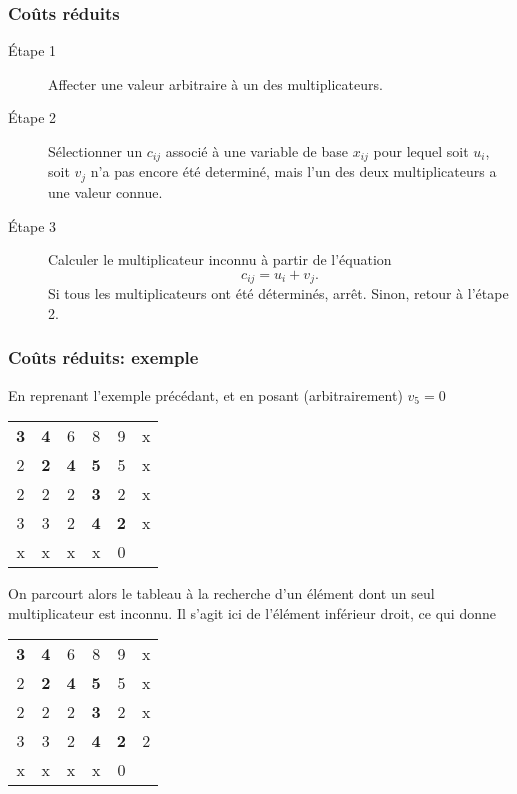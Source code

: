 \documentclass[usepdftitle=false]{beamer}
\begin{document}
\begin{frame}
\frametitle{Coûts réduits}

\begin{description}
\item[\'Etape 1]
Affecter une valeur arbitraire à un des multiplicateurs.
\item[\'Etape 2]
Sélectionner un $c_{ij}$ associé à une variable de base $x_{ij}$ pour lequel soit $u_i$, soit $v_j$ n'a pas encore été determiné, mais l'un des deux multiplicateurs a une valeur connue.
\item[\'Etape 3]
Calculer le multiplicateur inconnu à partir de l'équation
\[
c_{ij} = u_i + v_j.
\]
Si tous les multiplicateurs ont été déterminés, arrêt. Sinon, retour à l'étape 2.
\end{description}

\end{frame}

\begin{frame}
\frametitle{Coûts réduits: exemple}

En reprenant l'exemple précédant, et en posant (arbitrairement) $v_5 = 0$
\begin{center}
	\begin{tabular}{ccccc|c}
		{\bf 3} & {\bf 4} & 6 & 8 & 9 & x \\
		2 & {\bf 2} & {\bf 4} & {\bf 5} & 5 & x \\
		2 & 2 & 2 & {\bf 3} & 2 & x \\
		3 & 3 & 2 & {\bf 4} & {\bf 2} & x \\
		\hline
		x & x & x & x & 0 & 
	\end{tabular}
\end{center}
On parcourt alors le tableau à la recherche d'un élément dont un seul multiplicateur est inconnu. Il s'agit ici de l'élément inférieur droit, ce qui donne
\begin{center}
	\begin{tabular}{ccccc|c}
		{\bf 3} & {\bf 4} & 6 & 8 & 9 & x \\
		2 & {\bf 2} & {\bf 4} & {\bf 5} & 5 & x \\
		2 & 2 & 2 & {\bf 3} & 2 & x \\
		3 & 3 & 2 & {\bf 4} & {\bf 2} & 2 \\
		\hline
		x & x & x & x & 0 & 
	\end{tabular}
\end{center}

\end{frame}
\end{document}
